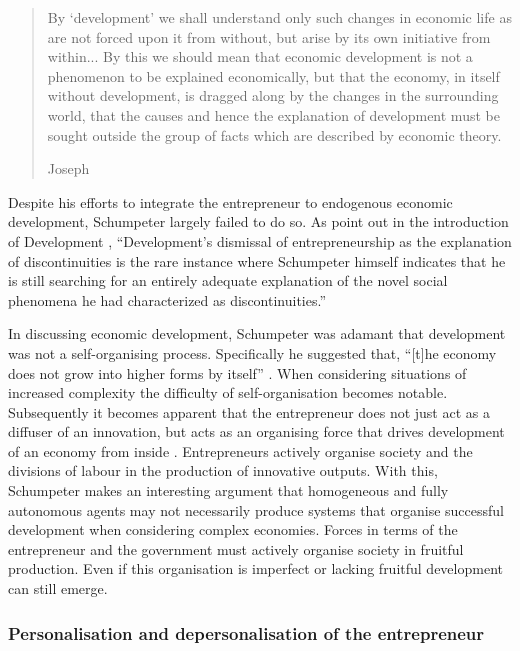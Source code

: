 \begin{quote}
By `development' we shall understand only such changes in economic life as are not forced upon it from without, but arise by its own initiative from within... By this we should mean that economic development is not a phenomenon to be explained economically, but that the economy, in itself without development, is dragged along by the changes in the surrounding world, that the causes and hence the explanation of development must be sought outside the group of facts which are described by economic theory.
\begin{flushright}
Joseph \citet[p.~63]{Schumpeter1934}
\end{flushright}
\end{quote}

Despite his efforts to integrate the entrepreneur to endogenous economic development, Schumpeter largely failed to do so. As \citet{Becker2006} point out in the introduction of Development \citet[p.~111]{Schumpeter2005}, ``Development's dismissal of entrepreneurship as the explanation of discontinuities is the rare instance where Schumpeter himself indicates that he is still searching for an entirely adequate explanation of the novel social phenomena he had characterized as discontinuities.''

In discussing economic development, Schumpeter was adamant that development was not a self-organising process. Specifically he suggested that, ``[t]he economy does not grow into higher forms by itself'' \citep[p.~75]{Schumpeter2003}. When considering situations of increased complexity the difficulty of self-organisation becomes notable. Subsequently it becomes apparent that the entrepreneur does not just act as a diffuser of an innovation, but acts as an organising force that drives development of an economy from inside \citep{Marz1991}. Entrepreneurs actively organise society and the divisions of labour in the production of innovative outputs. With this, Schumpeter makes an interesting argument that homogeneous and fully autonomous agents may not necessarily produce systems that organise successful development when considering complex economies. Forces in terms of the entrepreneur and the government must actively organise society in fruitful production. Even if this organisation is imperfect or lacking fruitful development can still emerge.

\subsubsection{Personalisation and depersonalisation of the entrepreneur}

